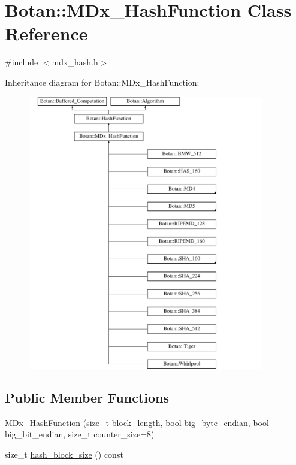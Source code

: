 \hypertarget{classBotan_1_1MDx__HashFunction}{\section{Botan\-:\-:M\-Dx\-\_\-\-Hash\-Function Class Reference}
\label{classBotan_1_1MDx__HashFunction}
}


{\ttfamily \#include $<$mdx\-\_\-hash.\-h$>$}

Inheritance diagram for Botan\-:\-:M\-Dx\-\_\-\-Hash\-Function\-:\begin{figure}[H]
\begin{center}
\leavevmode
\includegraphics[height=12.000000cm]{classBotan_1_1MDx__HashFunction}
\end{center}
\end{figure}
\subsection*{Public Member Functions}
\begin{DoxyCompactItemize}
\item 
\hyperlink{classBotan_1_1MDx__HashFunction_a3c4047df306fe8c40ba5108c8bef1733}{M\-Dx\-\_\-\-Hash\-Function} (size\-\_\-t block\-\_\-length, bool big\-\_\-byte\-\_\-endian, bool big\-\_\-bit\-\_\-endian, size\-\_\-t counter\-\_\-size=8)
\item 
size\-\_\-t \hyperlink{classBotan_1_1MDx__HashFunction_ad58254596b3240aef475e3e9e93932db}{hash\-\_\-block\-\_\-size} () const 
\end{DoxyCompactItemize}
